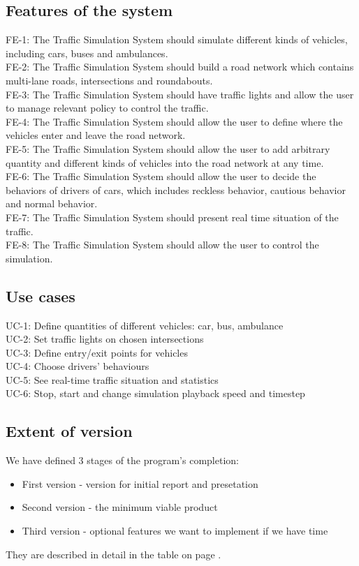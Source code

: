 \documentclass[a4paper,12pt]{article}
\begin{document}
\subsection{Features of the system}
FE-1: The Traffic Simulation System should simulate different kinds of vehicles, including cars, buses and ambulances.\\
FE-2: The Traffic Simulation System should build a road network which contains multi-lane roads, intersections and roundabouts.\\
FE-3: The Traffic Simulation System should have traffic lights and allow the user to manage relevant policy to control the traffic.\\
FE-4: The Traffic Simulation System should allow the user to define where the vehicles enter and leave the road network.\\
FE-5: The Traffic Simulation System should allow the user to add arbitrary quantity and different kinds of vehicles into the road network at any time.\\
FE-6: The Traffic Simulation System should allow the user to decide the behaviors of drivers of cars, which includes reckless behavior, cautious behavior and normal behavior.\\
FE-7: The Traffic Simulation System should present real time situation of the traffic.\\
FE-8: The Traffic Simulation System should allow the user to control the simulation.


\subsection{Use cases}
UC-1: Define quantities of different vehicles: car, bus, ambulance\\
UC-2: Set traffic lights on chosen intersections\\
UC-3: Define entry/exit points for vehicles\\
UC-4: Choose drivers' behaviours\\
UC-5: See real-time traffic situation and statistics\\
UC-6: Stop, start and change simulation playback speed and timestep

\subsection{Extent of version}

We have defined 3 stages of the program's completion:
\begin{itemize}
	\item{First version - version for initial report and presetation}
	\item{Second version - the minimum viable product}
	\item{Third version - optional features we want to implement if we have time}
\end{itemize}
They are described in detail in the table on page \pageref{versiontable}.
\end{document}

